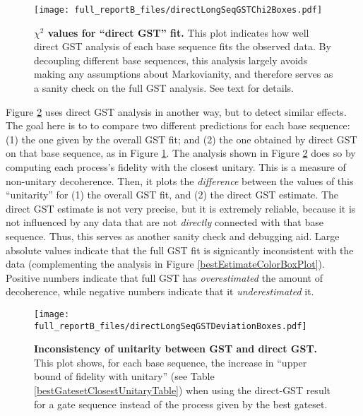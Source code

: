 {\begin{figure}
\begin{center}
\texttt{[image: full\_reportB\_files/directLongSeqGSTChi2Boxes.pdf]}
\caption{\textbf{$\chi^2$ values for ``direct GST'' fit.}  This plot indicates how well direct GST analysis of each base sequence fits the observed data.  By decoupling different base sequences, this analysis largely avoids making any assumptions about Markovianity, and therefore serves as a sanity check on the full GST analysis.  See text for details.\label{directLSGSTChi2BoxPlot}}
\end{center}
\end{figure}

Figure \ref{directLSGSTDeviationBoxPlot} uses direct GST analysis in another way, but to detect similar effects.   The goal here is to to compare two different predictions for each base sequence:  (1) the one given by the overall GST fit; and (2) the one obtained by direct GST on that base sequence, as in Figure \ref{directLSGSTChi2BoxPlot}.  The analysis shown in Figure \ref{directLSGSTDeviationBoxPlot} does so by computing each process's fidelity with the closest unitary.  This is a measure of non-unitary decoherence.  Then, it plots the \emph{difference} between the values of this ``unitarity'' for (1) the overall GST fit, and (2) the direct GST estimate.  The direct GST estimate is not very precise, but it is extremely reliable, because it is not influenced by any data that are not \emph{directly} connected with that base sequence.  Thus, this serves as another sanity check and debugging aid.  Large absolute values indicate that the full GST fit is signicantly inconsistent with the data (complementing the analysis in Figure \ref{bestEstimateColorBoxPlot}).  Positive numbers indicate that full GST has \emph{overestimated} the amount of decoherence, while negative numbers indicate that it \emph{underestimated} it.

\begin{figure}
\begin{center}
\texttt{[image: full\_reportB\_files/directLongSeqGSTDeviationBoxes.pdf]}
\caption{\textbf{Inconsistency of unitarity between GST and direct GST.}  This plot shows, for each base sequence, the increase in ``upper bound of fidelity with unitary'' (see Table \ref{bestGatesetClosestUnitaryTable}) when using the direct-GST result for a gate sequence instead of the process given by the best gateset.\label{directLSGSTDeviationBoxPlot}}
\end{center}
\end{figure}

}
